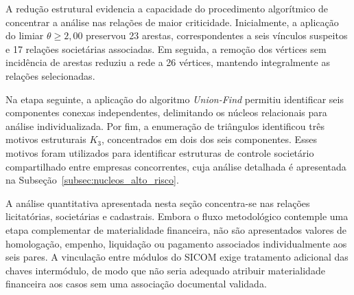 \begin{table}[!h]
  \centering
  \caption{Evolução Métrica do Pipeline de Redução Topológica}
  \label{tab:reducao_topologica}
\end{table}

A redução estrutural evidencia a capacidade do procedimento algorítmico de concentrar a análise nas relações de maior criticidade. Inicialmente, a aplicação do limiar $\theta \geq 2{,}00$ preservou 23 arestas, correspondentes a seis vínculos suspeitos e 17 relações societárias associadas. Em seguida, a remoção dos vértices sem incidência de arestas reduziu a rede a 26 vértices, mantendo integralmente as
relações selecionadas.

Na etapa seguinte, a aplicação do algoritmo \textit{Union-Find} permitiu identificar seis componentes conexas independentes, delimitando os núcleos relacionais para análise individualizada. Por fim, a enumeração de triângulos identificou três motivos estruturais $K_3$, concentrados em dois dos seis componentes. Esses motivos foram utilizados para identificar estruturas de controle societário compartilhado entre empresas concorrentes, cuja análise detalhada é apresentada na Subseção~\ref{subsec:nucleos_alto_risco}.



A análise quantitativa apresentada nesta seção concentra-se nas relações licitatórias, societárias e cadastrais. Embora o fluxo metodológico contemple uma etapa complementar de materialidade financeira, não são apresentados valores de homologação, empenho, liquidação ou pagamento associados individualmente aos seis pares. A vinculação entre módulos do SICOM exige tratamento adicional das chaves intermódulo, de modo que não seria adequado atribuir materialidade financeira aos casos sem uma associação documental validada.

